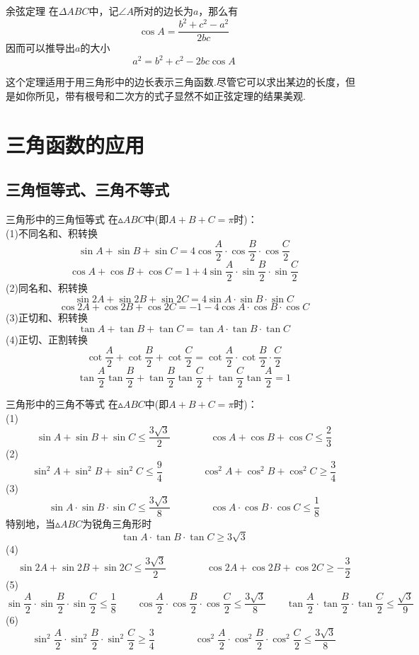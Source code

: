 \documentclass[lang=cn, zihao=5]{elegantbook}
\begin{document}
\begin{theorem}{余弦定理} %
    在$\Delta ABC$中，记$\angle A$所对的边长为$a$，那么有$$\cos{A}=\frac{b^2+c^2-a^2}{2bc}$$
    因而可以推导出$a$的大小$$a^2=b^2+c^2-2bc \cos{A}$$
\end{theorem}
这个定理适用于用三角形中的边长表示三角函数.尽管它可以求出某边的长度，但是如你所见，带有根号和二次方的式子显然不如正弦定理的结果美观.

\section{三角函数的应用}

\subsection{三角恒等式、三角不等式}

\begin{proposition}{三角形中的三角恒等式} %
    在$\vartriangle ABC$中(即$A+B+C=\pi$时)：\\
    (1)不同名和、积转换
    $$\sin A + \sin B + \sin C = 4 \cos \frac{A}{2} \cdot \cos \frac{B}{2} \cdot \cos \frac{C}{2}$$
    $$\cos A + \cos B + \cos C = 1 + 4 \sin \frac{A}{2} \cdot \sin \frac{B}{2} \cdot \sin \frac{C}{2}$$
    (2)同名和、积转换
    $$\sin 2A + \sin 2B + \sin 2C = 4\sin A \cdot \sin B \cdot \sin C$$
    $$\cos 2A + \cos 2B + \cos 2C = -1 - 4\cos A \cdot \cos B \cdot \cos C$$
    (3)正切和、积转换
    $$\tan A + \tan B + \tan C = \tan A \cdot \tan B \cdot \tan C$$
    (4)正切、正割转换
    $$\cot \frac{A}{2} + \cot \frac{B}{2} + \cot \frac{C}{2} = \cot \frac{A}{2} \cdot \cot \frac{B}{2} \cdot \frac{C}{2}$$
    $$\tan \frac{A}{2} \tan \frac{B}{2} + \tan \frac{B}{2} \tan \frac{C}{2} + \tan \frac{C}{2} \tan \frac{A}{2} = 1$$
\end{proposition}

\begin{proposition}{三角形中的三角不等式} %
    在$\vartriangle ABC$中(即$A+B+C=\pi$时)：\\
    (1)$$\sin A + \sin B + \sin C \leq \frac{ 3\sqrt{3} }{2} \qquad \qquad \cos A + \cos B + \cos C \leq \frac{2}{3}$$
    (2)$$\sin ^2 A + \sin ^2 B + \sin ^2 C \leq \frac{9}{4} \qquad \qquad \cos ^2 A + \cos ^2 B + \cos ^2 C \geq \frac{3}{4}$$
    (3)$$\sin A \cdot \sin B \cdot \sin C \leq \frac{ 3\sqrt{3} }{8} \qquad \qquad \cos A \cdot \cos B \cdot \cos C \leq \frac{1}{8}$$
    特别地，当$\vartriangle ABC$为锐角三角形时
    $$\tan A \cdot \tan B \cdot \tan C \geq 3\sqrt{3}$$
    (4)
    $$\sin 2A + \sin 2B + \sin 2C \leq \frac{ 3\sqrt{3} }{2} \qquad \qquad \cos 2A + \cos 2B + \cos 2C \geq -\frac{3}{2}$$
    (5)
    $$\sin \frac{A}{2} \cdot \sin \frac{B}{2} \cdot \sin \frac{C}{2} \leq \frac{1}{8} \qquad \cos \frac{A}{2} \cdot \cos \frac{B}{2} \cdot \cos \frac{C}{2} \leq \frac{3 \sqrt{3}}{8} \qquad \tan \frac{A}{2} \cdot \tan \frac{B}{2} \cdot \tan \frac{C}{2} \leq \frac{\sqrt{3}}{9}$$
    (6)$$\sin ^2 \frac{A}{2} \cdot \sin ^2 \frac{B}{2} \cdot \sin ^2 \frac{C}{2} \geq \frac{3}{4} \qquad \qquad \cos ^2 \frac{A}{2} \cdot \cos ^2 \frac{B}{2} \cdot \cos ^2 \frac{C}{2} \leq \frac{3 \sqrt{3}}{8}$$
\end{proposition}
\end{document}
